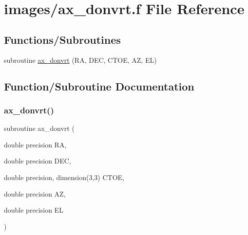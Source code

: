 \hypertarget{ax__donvrt_8f}{}\section{images/ax\+\_\+donvrt.f File Reference}
\label{ax__donvrt_8f}
\subsection*{Functions/\+Subroutines}
\begin{DoxyCompactItemize}
\item 
subroutine \hyperlink{ax__donvrt_8f_a4029e9da06a6eb1234c57c1808d07715}{ax\+\_\+donvrt} (RA, D\+EC, C\+T\+OE, AZ, EL)
\end{DoxyCompactItemize}


\subsection{Function/\+Subroutine Documentation}
\mbox{\label{ax__donvrt_8f_a4029e9da06a6eb1234c57c1808d07715}} 
\subsubsection{\texorpdfstring{ax\+\_\+donvrt()}{ax\_donvrt()}}
{\footnotesize\ttfamily subroutine ax\+\_\+donvrt (\begin{DoxyParamCaption}\item[{double precision}]{RA,  }\item[{double precision}]{D\+EC,  }\item[{double precision, dimension(3,3)}]{C\+T\+OE,  }\item[{double precision}]{AZ,  }\item[{double precision}]{EL }\end{DoxyParamCaption})}

